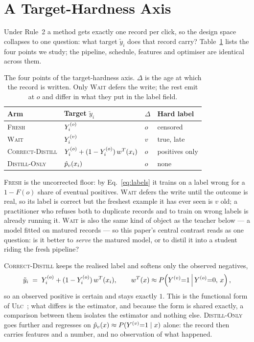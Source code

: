 \section{A Target-Hardness Axis}
\label{sec:axis}

Under Rule~2 a method gets exactly one record per click, so the design space collapses to one
question: what target $\tilde y_i$ does that record carry? Table~\ref{tab:axis} lists the four
points we study; the pipeline, schedule, features and optimiser are identical across them.

\begin{table}[t]
\centering
\caption{The four points of the target-hardness axis. $\Delta$ is the age at which the record is
written. Only \textsc{Wait} defers the write; the rest emit at $o$ and differ in what they put
in the label field.}
\label{tab:axis}
\begin{tabular}{@{}llll@{}}
\toprule
Arm & Target $\tilde y_i$ & $\Delta$ & Hard label \\
\midrule
\textsc{Fresh}           & $Y^{(o)}_i$                                  & $o$ & censored \\
\textsc{Wait}            & $Y^{(v)}_i$                                  & $v$ & true, late \\
\textsc{Correct-Distill} & $Y^{(o)}_i + (1-Y^{(o)}_i)\,w^{T}(x_i)$            & $o$ & positives only \\
\textsc{Distill-Only}    & $\hat{p}_v(x_i)$                               & $o$ & none \\
\bottomrule
\end{tabular}
\end{table}

\textsc{Fresh} is the uncorrected floor: by Eq.~\eqref{eq:labels} it trains on a label wrong for
a $1-F(o)$ share of eventual positives. \textsc{Wait} defers the write until the outcome is
real, so its label is correct but the freshest example it has ever seen is $v$ old; a
practitioner who refuses both to duplicate records and to train on wrong labels is already
running it. \textsc{Wait} is also the same kind of object as the teacher below --- a model
fitted on matured records --- so this paper's central contrast reads as one question: is it
better to \emph{serve} the matured model, or to distil it into a student riding the fresh
pipeline?

\textsc{Correct-Distill} keeps the realised label and softens only the observed negatives,
\begin{equation}
  \tilde y_i \;=\; Y^{(o)}_i + (1-Y^{(o)}_i)\,w^{T}(x_i),
  \qquad
  w^{T}(x) \approx P\!\left(Y^{(v)}{=}1 \,\middle|\, Y^{(o)}{=}0,\, x\right),
  \label{eq:hybrid}
\end{equation}
so an observed positive is certain and stays exactly $1$. This is the functional form of
\textsc{Ulc}~\cite{wang2023unbiased}; what differs is the estimator, and because the form is
shared exactly, a comparison between them isolates the estimator and nothing else.
\textsc{Distill-Only} goes further and regresses on $\hat{p}_v(x)\approx P(Y^{(v)}{=}1\mid x)$ alone: the
record then carries features and a number, and no observation of what happened.

